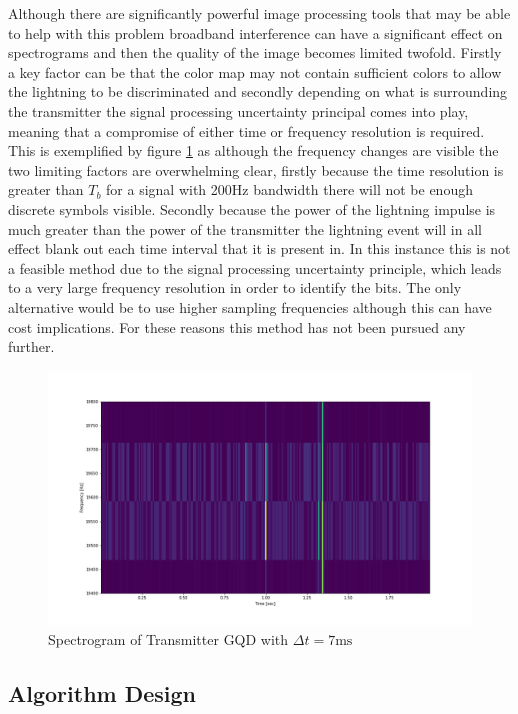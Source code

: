 Although there are significantly powerful image processing tools that may be able to help with this problem broadband interference can have a significant effect on spectrograms and then the quality of the image becomes limited twofold. Firstly a key factor can be that the color map may not contain sufficient colors to allow the lightning to be discriminated and secondly depending on what is surrounding the transmitter the signal processing uncertainty principal comes into play, meaning that a compromise of either time or frequency resolution is required. This is exemplified by figure \ref{fig:gqdspect} as although the frequency changes are visible the two limiting factors are overwhelming clear, firstly because the time resolution is greater than $T_b$ for a signal with 200Hz bandwidth there will not be enough discrete symbols visible. Secondly because the power of the lightning impulse is much greater than the power of the transmitter the lightning event will in all effect blank out each time interval that it is present in. In this instance this is not a feasible method due to the signal processing uncertainty principle, which leads to a very large frequency resolution in order to identify the bits. The only alternative would be to use higher sampling frequencies although this can have cost implications. For these reasons this method has not been pursued any further.

\begin{figure}[h!]
    \centering
    \includegraphics[width = \textwidth]{figs/sim/symRecovery/GQDSpectrogram.png}
    \caption{Spectrogram of Transmitter GQD with $\Delta t = 7\si{\milli\second}$}
    \label{fig:gqdspect}
\end{figure}

\subsection{Algorithm Design}

